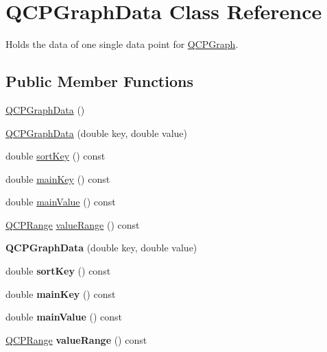 \hypertarget{class_q_c_p_graph_data}{}\section{Q\+C\+P\+Graph\+Data Class Reference}
\label{class_q_c_p_graph_data}


Holds the data of one single data point for \hyperlink{class_q_c_p_graph}{Q\+C\+P\+Graph}.  


\subsection*{Public Member Functions}
\begin{DoxyCompactItemize}
\item 
\hyperlink{class_q_c_p_graph_data_ac43f7499383d2fa2ffb7a4ad43f76c7c}{Q\+C\+P\+Graph\+Data} ()
\item 
\hyperlink{class_q_c_p_graph_data_a2c32177f12f902f4e05f712837082bd6}{Q\+C\+P\+Graph\+Data} (double key, double value)
\item 
double \hyperlink{class_q_c_p_graph_data_a5e0f37ea101eeec245d8c32a2206b204}{sort\+Key} () const
\item 
double \hyperlink{class_q_c_p_graph_data_a72fdaf738f679ef93bea3d552ba42d1b}{main\+Key} () const
\item 
double \hyperlink{class_q_c_p_graph_data_a1b1e440a430a4a83d9a3f6f247510f27}{main\+Value} () const
\item 
\hyperlink{class_q_c_p_range}{Q\+C\+P\+Range} \hyperlink{class_q_c_p_graph_data_a2f8dd30360356f66cc418a170a9f3792}{value\+Range} () const
\item 
\mbox{\label{class_q_c_p_graph_data_a2c32177f12f902f4e05f712837082bd6}} 
{\bfseries Q\+C\+P\+Graph\+Data} (double key, double value)
\item 
\mbox{\label{class_q_c_p_graph_data_a5e0f37ea101eeec245d8c32a2206b204}} 
double {\bfseries sort\+Key} () const
\item 
\mbox{\label{class_q_c_p_graph_data_a72fdaf738f679ef93bea3d552ba42d1b}} 
double {\bfseries main\+Key} () const
\item 
\mbox{\label{class_q_c_p_graph_data_a1b1e440a430a4a83d9a3f6f247510f27}} 
double {\bfseries main\+Value} () const
\item 
\mbox{\label{class_q_c_p_graph_data_a2f8dd30360356f66cc418a170a9f3792}} 
\hyperlink{class_q_c_p_range}{Q\+C\+P\+Range} {\bfseries value\+Range} () const
\end{DoxyCompactItemize}
